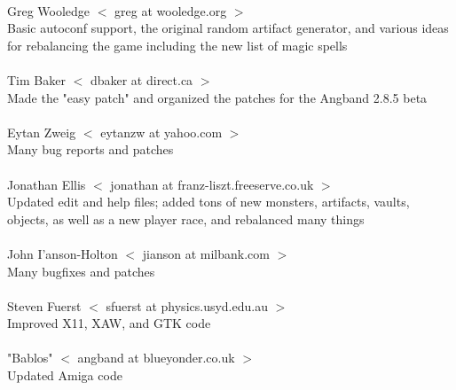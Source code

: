 \paragraph{}
Greg Wooledge $<$ greg at wooledge.org $>$ \\
Basic autoconf support, the original random artifact generator, and 
various ideas for rebalancing the game including the new list of magic 
spells

\paragraph{}
Tim Baker $<$ dbaker at direct.ca $>$ \\
Made the "easy patch" and organized the patches for the Angband 2.8.5 beta

\paragraph{}
Eytan Zweig $<$ eytanzw at yahoo.com $>$ \\
Many bug reports and patches

\paragraph{}
Jonathan Ellis $<$ jonathan at franz-liszt.freeserve.co.uk $>$ \\
Updated edit and help files; added tons of new monsters, artifacts,
vaults, objects, as well as a new player race, and rebalanced many things

\paragraph{}
John I'anson-Holton $<$ jianson at milbank.com $>$ \\
Many bugfixes and patches

\paragraph{}
Steven Fuerst $<$ sfuerst at physics.usyd.edu.au $>$ \\
Improved X11, XAW, and GTK code

\paragraph{}
"Bablos" $<$ angband at blueyonder.co.uk $>$ \\
Updated Amiga code

